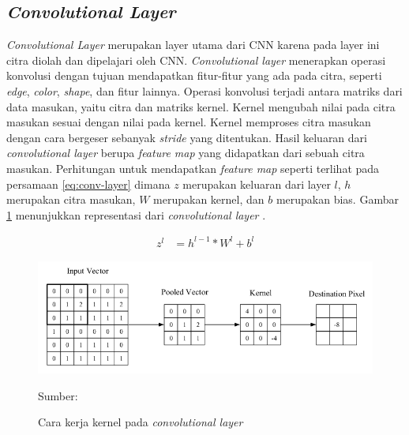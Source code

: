     \subsection{\textit{Convolutional Layer}}
    \textit{Convolutional Layer} merupakan layer utama dari CNN karena pada layer ini citra diolah dan dipelajari oleh CNN. \textit{Convolutional layer} menerapkan operasi konvolusi dengan tujuan mendapatkan fitur-fitur yang ada pada citra, seperti \textit{edge}, \textit{color}, \textit{shape}, dan fitur lainnya. Operasi konvolusi terjadi antara matriks dari data masukan, yaitu citra dan matriks kernel. Kernel mengubah nilai pada citra masukan sesuai dengan nilai pada kernel. Kernel memproses citra masukan dengan cara bergeser sebanyak \textit{stride} yang ditentukan. Hasil keluaran dari \textit{convolutional layer} berupa \textit{feature map} yang didapatkan dari sebuah citra masukan. Perhitungan untuk mendapatkan \textit{feature map} seperti terlihat pada persamaan \ref{eq:conv-layer} dimana $z$ merupakan keluaran dari layer $l$, $h$ merupakan citra masukan, $W$ merupakan kernel, dan $b$ merupakan bias. Gambar \ref{fig:conv} menunjukkan representasi dari \textit{convolutional layer} \citep{OShea2015}.

    \begin{align}
        \label{eq:conv-layer}
        z^l &= h^{l-1}\ast W^l + b^l
    \end{align}

    \begin{figure}[H]
        \begin{center}
            \includegraphics[width=12cm]{../img/CNN Convolutional Layer - Latex.png}
            \caption{Cara kerja kernel pada \textit{convolutional layer}}
            \label{fig:conv}
            Sumber: \citep{OShea2015}
        \end{center}
    \end{figure}

